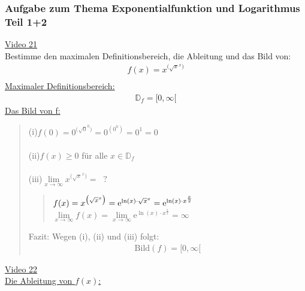 \subsubsection{Aufgabe zum Thema Exponentialfunktion und Logarithmus Teil 1+2}
\href{https://youtu.be/g6oiy5HrFNo}{Video 21}\\
Bestimme den maximalen Definitionsbereich, die Ableitung und das Bild von:\\
\begin{align*}
f(x)=x^{\big(\sqrt{x}^x\big)}\\
\end{align*}
\underline{Maximaler Definitionsbereich:}\\
\begin{align*}
\mathbb{D}_f=[0,\infty[
\end{align*}
\underline{Das Bild von f:}\\
\begin{quote}
	(i)\;\;$ f(0)=0^{\big(\sqrt{0}^0\big)}=0^{(0^0)}=0^1=0 $\\
	\\
	(ii)\;$ f(x)\geq 0 $ für alle $ x\in \mathbb{D}_f $\\
	\\
	(iii)$ \lim\limits_ {x\to\infty}x^{\big(\sqrt{x}^x\big)}=\;\;? $\\
	\begin{quote}
		$ f(x)=x^{\big(\sqrt{x}^x\big)}=\mathrm{e}^{\ln(x)\cdot \sqrt{x}^x}=\mathrm{e}^{\ln(x)\cdot x^{\genfrac{}{}{}{2}{x }{2 }}} $\\
		$ \lim\limits_ {x\to\infty}f(x)=\lim\limits_ {x\to\infty}\mathrm{e}^{\ln(x)\cdot x^{\frac{x}{2}}} =\infty $	
	\end{quote}
	Fazit: Wegen (i), (ii) und (iii) folgt:\\
	\begin{align*}
	\mathrm{Bild}(f)=[0,\infty[
	\end{align*}
\end{quote}
\newpage
\noindent
\href{https://youtu.be/qDxy5Th1pfc}{Video 22}\\
\underline{Die Ableitung von $ f(x) $:}\\
